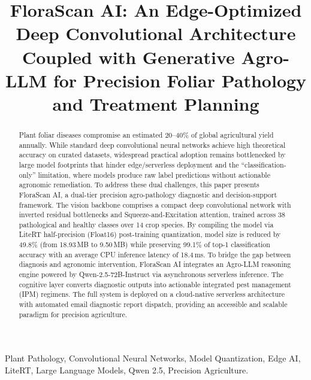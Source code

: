 \documentclass[conference]{IEEEtran}
\begin{document}
\title{FloraScan AI: An Edge-Optimized Deep Convolutional Architecture Coupled with Generative Agro-LLM for Precision Foliar Pathology and Treatment Planning}

\author{
}

\maketitle

\begin{abstract}
Plant foliar diseases compromise an estimated 20--40\% of global agricultural yield annually. While standard deep convolutional neural networks achieve high theoretical accuracy on curated datasets, widespread practical adoption remains bottlenecked by large model footprints that hinder edge/serverless deployment and the ``classification-only'' limitation, where models produce raw label predictions without actionable agronomic remediation. To address these dual challenges, this paper presents FloraScan AI, a dual-tier precision agro-pathology diagnostic and decision-support framework. The vision backbone comprises a compact deep convolutional network with inverted residual bottlenecks and Squeeze-and-Excitation attention, trained across 38 pathological and healthy classes over 14 crop species. By compiling the model via LiteRT half-precision (Float16) post-training quantization, model size is reduced by 49.8\% (from 18.93\,MB to 9.50\,MB) while preserving 99.1\% of top-1 classification accuracy with an average CPU inference latency of 18.4\,ms. To bridge the gap between diagnosis and agronomic intervention, FloraScan AI integrates an Agro-LLM reasoning engine powered by Qwen-2.5-72B-Instruct via asynchronous serverless inference. The cognitive layer converts diagnostic outputs into actionable integrated pest management (IPM) regimens. The full system is deployed on a cloud-native serverless architecture with automated email diagnostic report dispatch, providing an accessible and scalable paradigm for precision agriculture.
\end{abstract}

\begin{IEEEkeywords}
Plant Pathology, Convolutional Neural Networks, Model Quantization, Edge AI, LiteRT, Large Language Models, Qwen 2.5, Precision Agriculture.
\end{IEEEkeywords}
\end{document}
